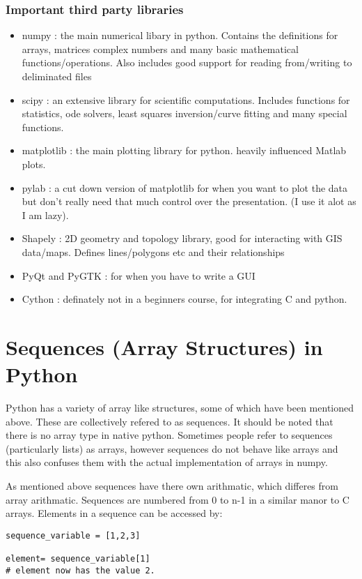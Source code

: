 \documentclass[11pt,a4paper]{article}
\begin{document}
\subsubsection{Important third party libraries}
\begin{itemize}
\item numpy : the main numerical libary in python. Contains the definitions for arrays, matrices complex numbers and many basic mathematical functions/operations. Also includes good support for reading from/writing to deliminated files
\item scipy : an extensive library for scientific computations. Includes functions for statistics, ode solvers, least squares inversion/curve fitting and many special functions.
\item matplotlib : the main plotting library for python. heavily influenced Matlab plots.
\item pylab : a cut down version of matplotlib for when you want to plot the data but don't really need that much control over the presentation. (I use it alot as I am lazy).
\item Shapely : 2D geometry and topology library, good for interacting with GIS data/maps. Defines lines/polygons etc and their relationships
\item PyQt and PyGTK : for when you have to write a GUI
\item Cython : definately not in a beginners course, for integrating C and python.
\end{itemize}

\section{Sequences (Array Structures) in Python} \label{sequences}

Python has a variety of array like structures, some of which have been mentioned above. These are collectively refered to as sequences. It should be noted that there is no array type in native python. Sometimes people refer to sequences (particularly lists) as arrays, however sequences do not behave like arrays and this also confuses them with the actual implementation of arrays in numpy.

As mentioned above sequences have there own arithmatic, which differes from array arithmatic. Sequences are numbered from 0 to n-1 in a similar manor to C arrays. Elements in a sequence can be accessed by:

\begin{verbatim}
sequence_variable = [1,2,3]

element= sequence_variable[1]
# element now has the value 2.
\end{verbatim}
\end{document}
